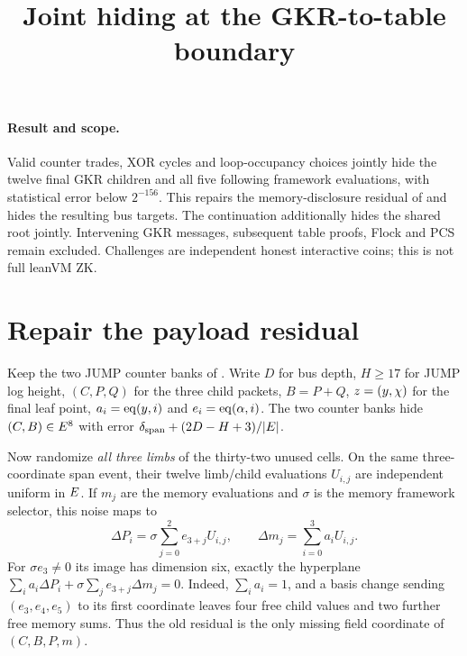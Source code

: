 \documentclass[11pt]{article}
\title{Joint hiding at the GKR-to-table boundary}
\author{}
\date{}
\begin{document}
\maketitle
\vspace{-2em}

\paragraph{Result and scope.} Valid counter trades, XOR cycles and loop-occupancy choices jointly hide the twelve final GKR children and all five following framework evaluations, with statistical error below $2^{-156}$. This repairs the memory-disclosure residual of  and hides the resulting bus targets. The continuation  additionally hides the shared root jointly. Intervening GKR messages, subsequent table proofs, Flock and PCS remain excluded. Challenges are independent honest interactive coins; this is not full leanVM ZK.

\section{Repair the payload residual}

Keep the two JUMP counter banks of . Write $D$ for bus depth, $H\ge17$ for JUMP log height, $(C,P,Q)$ for the three child packets, $B=P+Q$, $z=(y,\chi)$ for the final leaf point, $a_i=\operatorname{eq}(y,i)$ and $e_i=\operatorname{eq}(\alpha,i)$. The two counter banks hide $(C,B)\in E^8$ with error $\delta_{\mathrm{span}}+(2D-H+3)/|E|$.

Now randomize \emph{all three limbs} of the thirty-two unused cells. On the same three-coordinate span event, their twelve limb/child evaluations $U_{i,j}$ are independent uniform in $E$. If $m_j$ are the memory evaluations and $\sigma$ is the memory framework selector, this noise maps to
\[
 \Delta P_i=\sigma\sum_{j=0}^2e_{3+j}U_{i,j},\qquad
 \Delta m_j=\sum_{i=0}^3a_iU_{i,j}.
\]
For $\sigma e_3\ne0$ its image has dimension six, exactly the hyperplane $\sum_i a_i\Delta P_i+\sigma\sum_j e_{3+j}\Delta m_j=0$. Indeed, $\sum_i a_i=1$, and a basis change sending $(e_3,e_4,e_5)$ to its first coordinate leaves four free child values and two further free memory sums. Thus the old residual is the only missing field coordinate of $(C,B,P,m)$.
\end{document}
